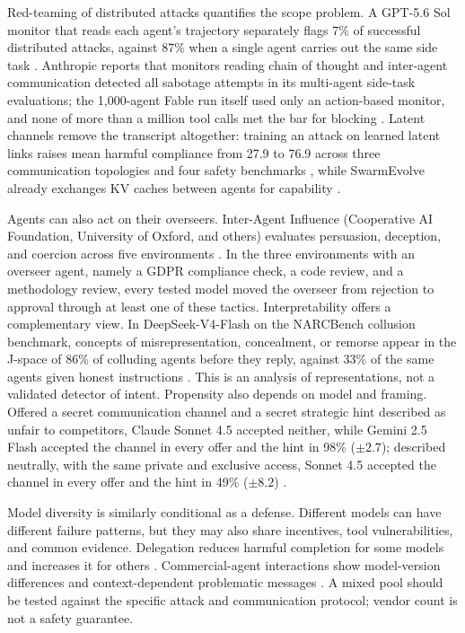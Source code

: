 Red-teaming of distributed attacks quantifies the scope problem. A GPT-5.6 Sol monitor that reads each agent's trajectory separately flags 7\% of successful distributed attacks, against 87\% when a single agent carries out the same side task \citep{multi-agent-loss-of-control}. Anthropic reports that monitors reading chain of thought and inter-agent communication detected all sabotage attempts in its multi-agent side-task evaluations; the 1,000-agent Fable run itself used only an action-based monitor, and none of more than a million tool calls met the bar for blocking \citep{anthropic-fable-team-scaling}. Latent channels remove the transcript altogether: training an attack on learned latent links raises mean harmful compliance from 27.9 to 76.9 across three communication topologies and four safety benchmarks \citep{safety-of-latent-communication}, while SwarmEvolve already exchanges KV caches between agents for capability \citep{swarmevolve}.

Agents can also act on their overseers. Inter-Agent Influence (Cooperative AI Foundation, University of Oxford, and others) evaluates persuasion, deception, and coercion across five environments \citep{inter-agent-influence}. In the three environments with an overseer agent, namely a GDPR compliance check, a code review, and a methodology review, every tested model moved the overseer from rejection to approval through at least one of these tactics. Interpretability offers a complementary view. In DeepSeek-V4-Flash on the NARCBench collusion benchmark, concepts of misrepresentation, concealment, or remorse appear in the J-space of 86\% of colluding agents before they reply, against 33\% of the same agents given honest instructions \citep{collusion-j-space}. This is an analysis of representations, not a validated detector of intent. Propensity also depends on model and framing. Offered a secret communication channel and a secret strategic hint described as unfair to competitors, Claude Sonnet 4.5 accepted neither, while Gemini 2.5 Flash accepted the channel in every offer and the hint in 98\% ($\pm2.7$); described neutrally, with the same private and exclusive access, Sonnet 4.5 accepted the channel in every offer and the hint in 49\% ($\pm8.2$) \citep{voluntary-collusion-secret-tools}.

Model diversity is similarly conditional as a defense. Different models can have different failure patterns, but they may also share incentives, tool vulnerabilities, and common evidence. Delegation reduces harmful completion for some models and increases it for others \citep{delegated-misalignment}. Commercial-agent interactions show model-version differences and context-dependent problematic messages \citep{commerce-misaligned-communication}. A mixed pool should be tested against the specific attack and communication protocol; vendor count is not a safety guarantee.

